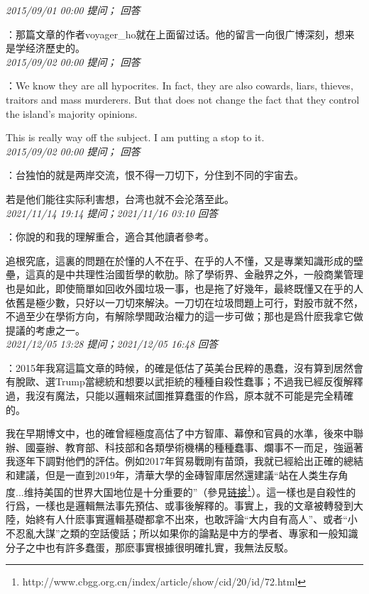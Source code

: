 \documentclass[twocolumn]{ctexart}
\begin{document}
\textit{\hfill\noindent\small 2015/09/01 00:00 提问； 回答}

：那篇文章的作者voyager\_ho就在上面留过话。他的留言一向很广博深刻，想来是学经济歷史的。\\

\textit{\hfill\noindent\small 2015/09/02 00:00 提问； 回答}

：We know they are all hypocrites. In fact, they are also cowards, liars, thieves, traitors and mass murderers. But that does not change the fact that they control the island's majority opinions.

This is really way off the subject. I am putting a stop to it.\\

\textit{\hfill\noindent\small 2015/09/02 00:00 提问； 回答}

：台独怕的就是两岸交流，恨不得一刀切下，分住到不同的宇宙去。

若是他们能往实际利害想，台湾也就不会沦落至此。\\

\textit{\hfill\noindent\small 2021/11/14 19:14 提问；2021/11/16 03:10 回答}

：你說的和我的理解重合，適合其他讀者參考。

追根究底，這裏的問題在於懂的人不在乎、在乎的人不懂，又是專業知識形成的壁壘，這真的是中共理性治國哲學的軟肋。除了學術界、金融界之外，一般商業管理也是如此，即使簡單如回收外國垃圾一事，也是拖了好幾年，最終既懂又在乎的人依舊是極少數，只好以一刀切來解決。一刀切在垃圾問題上可行，對股市就不然，不過至少在學術方向，有解除學閥政治權力的這一步可做；那也是爲什麽我拿它做提議的考慮之一。
\\

\textit{\hfill\noindent\small 2021/12/05 13:28 提问；2021/12/05 16:48 回答}

：2015年我寫這篇文章的時候，的確是低估了英美台民粹的愚蠢，沒有算到居然會有脫歐、選Trump當總統和想要以武拒統的種種自殺性蠢事；不過我已經反復解釋過，我沒有魔法，只能以邏輯來試圖推算蠢蛋的作爲，原本就不可能是完全精確的。

我在早期博文中，也的確曾經極度高估了中方智庫、幕僚和官員的水準，後來中聯辦、國臺辦、教育部、科技部和各類學術機構的種種蠢事、爛事不一而足，強逼著我逐年下調對他們的評估。例如2017年貿易戰剛有苗頭，我就已經給出正確的總結和建議，但是一直到2019年，清華大學的金磚智庫居然還建議“站在人类生存角度...维持美国的世界大国地位是十分重要的”（參見\href{http://www.cbgg.org.cn/index/article/show/cid/20/id/72.html}{链接\footnote{\url{http://www.cbgg.org.cn/index/article/show/cid/20/id/72.html}}}）。這一樣也是自殺性的行爲，一樣也是邏輯無法事先預估、或事後解釋的。事實上，我的文章被轉發到大陸，始終有人什麽事實邏輯基礎都拿不出來，也敢評論“大内自有高人”、或者“小不忍亂大謀”之類的空話傻話；所以如果你的論點是中方的學者、專家和一般知識分子之中也有許多蠢蛋，那麽事實根據很明確扎實，我無法反駁。
\end{document}
